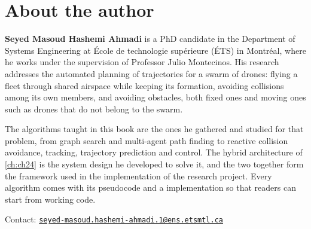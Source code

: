 \chapter{About the author}

\noindent
\textbf{Seyed Masoud Hashemi Ahmadi} is a PhD candidate in the Department of Systems
Engineering at École de technologie supérieure (ÉTS) in Montréal, where he works under
the supervision of Professor Julio Montecinos. His research addresses the automated
planning of trajectories for a swarm of drones: flying a fleet through shared airspace
while keeping its formation, avoiding collisions among its own members, and avoiding
obstacles, both fixed ones and moving ones such as drones that do not belong to the
swarm.

\medskip\noindent
The algorithms taught in this book are the ones he gathered and studied for that
problem, from graph search and multi-agent path finding to reactive collision
avoidance, tracking, trajectory prediction and control. The hybrid architecture of
\cref{ch:ch24} is the system design he developed to solve it, and the two together form
the framework used in the implementation of the research project. Every algorithm comes
with its pseudocode and a \python{} implementation so that readers can start from
working code.

\medskip\noindent
Contact: \href{mailto:seyed-masoud.hashemi-ahmadi.1@ens.etsmtl.ca}{\nolinkurl{seyed-masoud.hashemi-ahmadi.1@ens.etsmtl.ca}}
